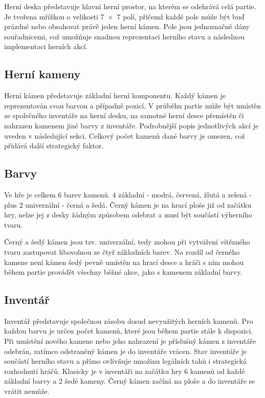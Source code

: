 Herní deska představuje hlavní herní prostor, na kterém se odehrává celá partie. Je tvořena mřížkou o velikosti 7~$\times$~7 polí, přičemž každé pole může být 
buď prázdné nebo obsahovat právě jeden herní kámen. Pole jsou jednoznačně dány souřadnicemi, což umožňuje snadnou reprezentaci herního stavu a následnou
implementaci herních akcí.

\subsection{Herní kameny}

Herní kámen představuje základní herní komponentu. Každý kámen je reprezentován svou barvou a případně pozicí. V průběhu partie může být umístěn
ze společného inventáře na herní desku, na samotné herní desce přemístěn či nahrazen kamenem jiné barvy z inventáře. 
Podrobnější popis jednotlivých akcí je uveden v následující sekci. Celkový počet kamenů dané barvy je omezen, což přidává další strategický faktor.

\subsection{Barvy}
\label{sec:colors}

Ve hře je celkem 6 barev kamenů. 4 základní - modrá, červená, žlutá a zelená - plus 2 univerzální - černá a šedá. Černý kámen je na hrací ploše již od začátku hry,
nelze jej z desky žádným způsobem odebrat a musí být součástí výherního tvaru.

Černý a šedý kámen jsou tzv. univerzální, tedy mohou při vytváření vítězného tvaru zastupovat libovolnou ze čtyř základních barev. Na rozdíl od černého 
kamene není kámen šedý pevně umístěn na hrací desce a hráči s ním mohou během partie provádět všechny běžné akce, jako s kamenem základní barvy.

\subsection{Inventář}

Inventář představuje společnou zásobu dosud nevyužitých herních kamenů. Pro každou barvu je určen počet kamenů, které jsou během partie stále k dispozici. 
Při umístění nového kamene nebo jeho nahrazení je příslušný kámen z inventáře odebrán, zatímco odstraněný kámen je do inventáře vrácen. Stav inventáře je 
součástí herního stavu a přímo ovlivňuje množinu legálních tahů i strategická rozhodnutí hráčů. Klasicky je v inventáři na začátku hry 6 kamenů od každé
základní barvy a 2 šedé kameny. Černý kámen začíná na ploše a do inventáře se vrátit nemůže.


